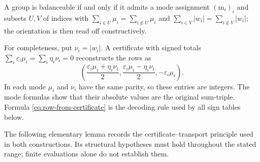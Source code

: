 \begin{corollary}\label{cor:cert}
A group is balanceable if and only if it admits a mode assignment $(\mathrm m_i)_i$ and subsets $U,V$ of indices
with $\sum_{i\in U}\mu_i=\sum_{i\notin U}\mu_i$ and $\sum_{i\in V}|w_i|=\sum_{i\notin V}|w_i|$; the
orientation is then read off constructively.
\end{corollary}

For completeness, put $\nu_i=|w_i|$.  A certificate with signed totals
$\sum_i\varepsilon_i\mu_i=\sum_i\eta_i\nu_i=0$ reconstructs the rows as
\begin{equation}\label{eq:row-from-certificate}
 \left(\frac{\varepsilon_i\mu_i+\eta_i\nu_i}{2},
       \frac{\varepsilon_i\mu_i-\eta_i\nu_i}{2},-\varepsilon_i\mu_i\right).
\end{equation}
In each mode $\mu_i$ and $\nu_i$ have the same parity, so these entries are integers.
The mode formulas show that their absolute values are the original sum-triple.  Formula
\eqref{eq:row-from-certificate} is the decoding rule used by all sign tables below.

The following elementary lemma records the certificate--transport principle used in both
constructions.  Its structural hypotheses must hold throughout the stated range; finite
evaluations alone do not establish them.

